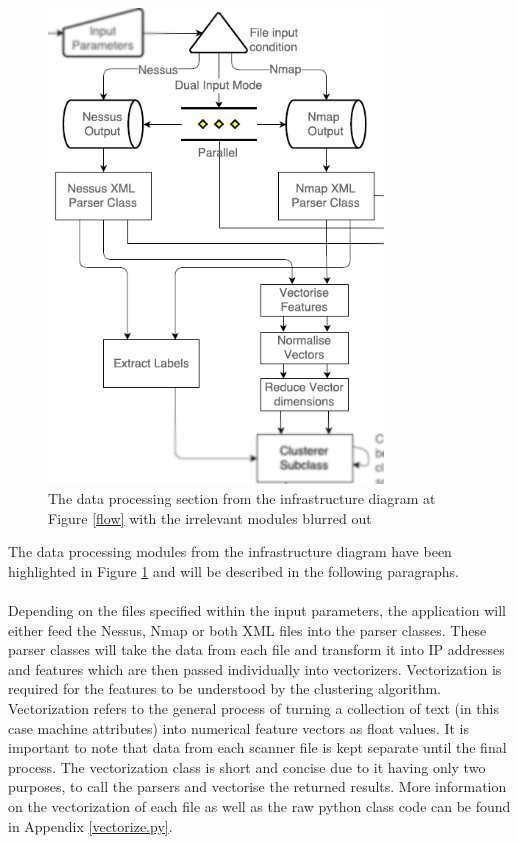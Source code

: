 \begin{figure}[!h]
\centering
\includegraphics[width=3.5in]{./Figures/infra2.png}
\caption{The data processing section from the infrastructure diagram at Figure \ref{flow} with the irrelevant modules blurred out}
\label{infra2}
\end{figure}
The data processing modules from the infrastructure diagram have been highlighted in Figure \ref{infra2} and will be described in the following paragraphs. \paragraph{}Depending on the files specified within  the input parameters, the application will either feed the Nessus, Nmap or both XML files into the parser classes. These parser classes will take the data from each file and transform it into IP addresses and features which are then passed individually into vectorizers. Vectorization is required for the features to be understood by the clustering algorithm. Vectorization refers to the general process of turning a collection of text (in this case machine attributes) into numerical feature vectors as float values. It is important to note that data from each scanner file is kept separate until the final process. The vectorization class is short and concise due to it having only two purposes, to call the parsers and vectorise the returned results. More information on the vectorization of each file as well as the raw python class code can be found in Appendix \ref{vectorize.py}.

